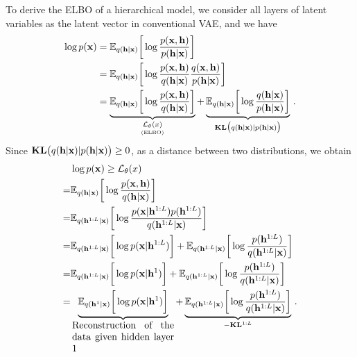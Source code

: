 \documentclass[twoside]{article}
\begin{document}
To derive the ELBO of a hierarchical model, we consider all  layers of latent variables as the latent vector in conventional VAE, and we have 
\begin{align*}
\log p(\mathbf{x}) &=  \mathbb{E}_{q(\mathbf{h} | \mathbf{x})} \bigg[ \log  \frac{p(\mathbf{x}, \mathbf{h})}{p(\mathbf{h}|\mathbf{x})} \bigg] \\
&=  \mathbb{E}_{q(\mathbf{h} | \mathbf{x})} \bigg[ \log  \frac{p(\mathbf{x}, \mathbf{h})}{q(\mathbf{h}|\mathbf{x})}   \frac{q(\mathbf{x}, \mathbf{h})}{p(\mathbf{h}|\mathbf{x})} \bigg] \\
&=  \underbrace{\mathbb{E}_{q(\mathbf{h} | \mathbf{x})} \bigg[ \log  \frac{p(\mathbf{x}, \mathbf{h})}{q(\mathbf{h}|\mathbf{x})}  \bigg]}_{\underset{\text{(ELBO)}}{\mathcal{L}_{\theta}(x)}} +   \underbrace{\mathbb{E}_{q(\mathbf{h} | \mathbf{x})} \bigg[ \log \frac{q(\mathbf{h} |\mathbf{x})}{p(\mathbf{h}|\mathbf{x})} \bigg]}_{\textbf{\text{KL}}\big(q(\mathbf{h} |\mathbf{x}) | p(\mathbf{h}|\mathbf{x})\big)} \, .
\end{align*}
Since $\textbf{\text{KL}}\big(q(\mathbf{h} |\mathbf{x}) | p(\mathbf{h}|\mathbf{x})\big) \geq 0$, as a distance between two distributions, we obtain
\begin{align}  \label{eq:tree_elbo}
&\log p(\mathbf{x})  \geq  \mathcal{L}_{\theta}(x) \\  \notag
=&  \mathbb{E}_{q(\mathbf{h} | \mathbf{x})} \bigg[ \log  \frac{p(\mathbf{x}, \mathbf{h})}{q(\mathbf{h}|\mathbf{x})}  \bigg]  \\  \notag
=&  \mathbb{E}_{q(\mathbf{h}^{1:L} | \mathbf{x})} \bigg[ \log  \frac{p(\mathbf{x} | \mathbf{h}^{1:L}) p( \mathbf{h}^{1:L})}{q(\mathbf{h}^{1:L}|\mathbf{x})}  \bigg]  \\   \notag
 =&  \mathbb{E}_{q(\mathbf{h}^{1:L} | \mathbf{x})} \bigg[  \log p(\mathbf{x} | \mathbf{h}^{1:L})  \bigg]  +  \mathbb{E}_{q(\mathbf{h}^{1:L} | \mathbf{x})} \bigg[ \log   \frac{p( \mathbf{h}^{1:L})}{q(\mathbf{h}^{1:L}|\mathbf{x})}  \bigg]   \\    \label{eq:layer0_a}
=&  \mathbb{E}_{q(\mathbf{h}^{1:L} | \mathbf{x})} \bigg[ \log p(\mathbf{x} | \mathbf{h}^{1})  \bigg]  +  \mathbb{E}_{q(\mathbf{h}^{1:L} | \mathbf{x})} \bigg[ \log     \frac{p( \mathbf{h}^{1:L})}{q(\mathbf{h}^{1:L}|\mathbf{x})}  \bigg]  \\ 
=&  \underbrace{ \mathbb{E}_{q(\mathbf{h}^{1} | \mathbf{x})} \bigg[ \log  p(\mathbf{x} | \mathbf{h}^{1})  \bigg] }_{  \parbox{10.5em}{Reconstruction of the data given hidden layer 1}}  +  \underbrace{  \mathbb{E}_{q(\mathbf{h}^{1:L} | \mathbf{x})} \bigg[ \log  \frac{p( \mathbf{h}^{1:L})}{q(\mathbf{h}^{1:L}|\mathbf{x})}  \bigg] }_{-\textbf{\text{KL}}^{1:L}} \, .     \label{eq:layer0_b}
\end{align}
\end{document}
